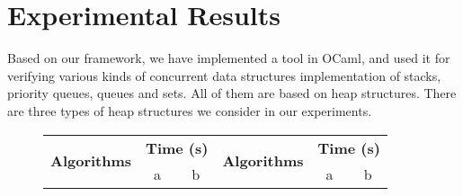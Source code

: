 \section{Experimental Results}
\label{section:experiments}
\newcommand{\emm}{(emm)}

 Based on our framework, we have implemented a tool in OCaml, and used it for verifying various kinds of concurrent data structures implementation of stacks, priority queues, queues and sets. All of them are based on heap structures. There are three types of heap structures we consider in our experiments.
\begin{figure}[]
\center
\begin{tabular}{|l | r| r | l | r | r |}
  \hline
  \multirow{2}{*}{\textsf{{\textbf{Algorithms}}}} &   \multicolumn{2}{c|}{\textsf{{\textbf{Time (s)}}}} & \multirow{2}{*}{\textsf{{\textbf{Algorithms}}}} &  \multicolumn{2}{c|}{\textsf{{\textbf{Time (s)}}}}  \\
   \cline{2-3} \cline{5-6} 
& \multicolumn{1}{c|}{\textsf{a}} & \multicolumn{1}{c|}{\textsf{b}} & & \multicolumn{1}{c|}{\textsf{a}} & \multicolumn{1}{c|}{\textsf{b}} \\
\hline
%
%
%
% 
%
%
%
%



\end{tabular}
\end{figure}
